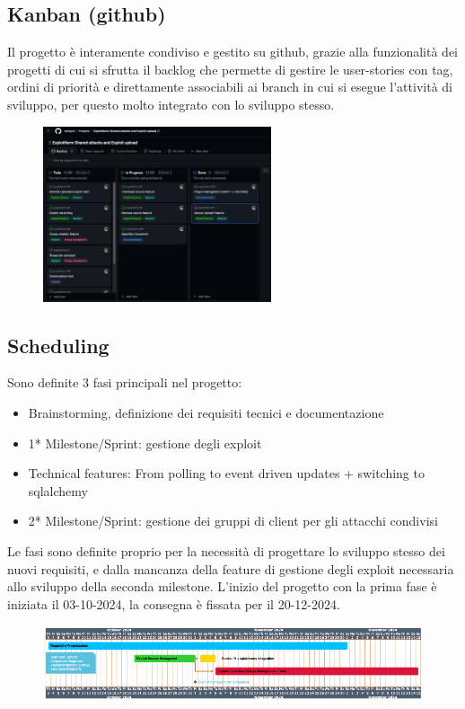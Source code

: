 \documentclass[11pt]{article}
\begin{document}
\subsection{Kanban (github)}
Il progetto è interamente condiviso e gestito su github, grazie alla funzionalità dei progetti di cui si sfrutta il backlog che permette di gestire le user-stories con tag, ordini di priorità e direttamente associabili ai branch in cui si esegue l'attività di sviluppo, per questo molto integrato con lo sviluppo stesso.
	\begin{figure}[H]
    	\centering
    	\includegraphics[width=0.6\textwidth]{backlog.png}
	\end{figure}
\subsection{Scheduling}
Sono definite 3 fasi principali nel progetto:
\begin{itemize}
    \item Brainstorming, definizione dei requisiti tecnici e documentazione
    \item 1* Milestone/Sprint: gestione degli exploit
    \item Technical features: From polling to event driven updates + switching to sqlalchemy
    \item 2* Milestone/Sprint: gestione dei gruppi di client per gli attacchi condivisi
\end{itemize}
Le fasi sono definite proprio per la necessità di progettare lo sviluppo stesso dei nuovi requisiti, e dalla mancanza della feature di gestione degli exploit necessaria allo sviluppo della seconda milestone.
L'inizio del progetto con la prima fase è iniziata il 03-10-2024, la consegna è fissata per il 20-12-2024.
	\begin{figure}[H]
		\centering
    	\includegraphics[width=1\textwidth]{scheduling.png}
	\end{figure}
\end{document}

